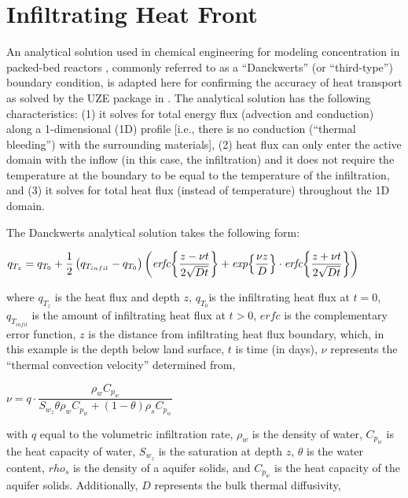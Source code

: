 \section{Infiltrating Heat Front}

An analytical solution used in chemical engineering for modeling concentration in packed-bed reactors , commonly referred to as a ``Danckwerts'' (or ``third-type'') boundary condition, is adapted here for confirming the accuracy of heat transport as solved by the UZE package in \mf.  The analytical solution has the following characteristics: (1) it solves for total energy flux (advection and conduction) along a 1-dimensional (1D) profile [i.e., there is no conduction (``thermal bleeding'') with the surrounding materials], (2) heat flux can only enter the active domain with the inflow (in this case, the infiltration) and it does not require the temperature at the boundary to be equal to the temperature of the infiltration, and (3) it solves for total heat flux (instead of temperature) throughout the 1D domain.

The Danckwerts analytical solution takes the following form:

\bigskip
$q_{T_z} = q_{T_0} + \dfrac{1}{2} \left( q_{T_{infil}} - q_{T_0} \right) \left( \textit{erfc} \biggl\{ \dfrac{z-\nu t}{2 \sqrt{Dt}} \biggr\}  + \textit{exp} \Bigl\{ \dfrac{\nu z}{D}\Bigr\} \cdot \textit{erfc} \biggl\{ \dfrac{z+\nu t}{2 \sqrt{Dt}} \biggr\} \right)$
\bigskip

\noindent where $q_{T_z}$ is the heat flux and depth $z$, $q_{T_0}$is the infiltrating heat flux at $t=0$, $q_{T_{infil}}$ is the amount of infiltrating heat flux at $t > 0$, $\textit{erfc}$ is the complementary error function, $z$ is the distance from infiltrating heat flux boundary, which, in this example is the depth below land surface, $t$ is time (in days), $\nu$ represents the ``thermal convection velocity'' determined from,

\bigskip
$\nu=q \cdot \dfrac{\rho_w C_{p_w}}{S_{w_z} \theta \rho_w C_{p_w} + \left( 1-\theta \right) \rho_s C_{p_w}}$
\bigskip

\noindent with $q$ equal to the volumetric infiltration rate, $\rho_w$ is the density of water, $C_{p_w}$ is the heat capacity of water, $S_{w_z}$ is the saturation at depth $z$, $\theta$ is the water content, $rho_s$ is the density of a aquifer solids, and $C_{p_w}$ is the heat capacity of the aquifer solids. Additionally, $D$ represents the bulk thermal diffusivity,

